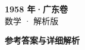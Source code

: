 \documentclass[zihao=-4, a4paper]{ctexart}
\begin{document}
\begin{center}
  {\Large\bfseries 1958 年·广东卷}\\[4pt]
  {\large 数学 · 解析版}
\end{center}
\medskip
{}

\clearpage
{}
\begin{center}{\Large\bfseries 参考答案与详细解析}\end{center}
\medskip

\end{document}
